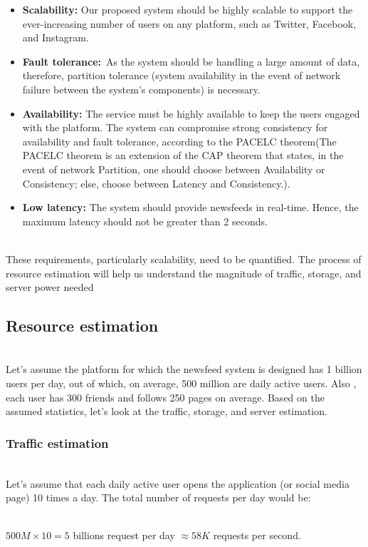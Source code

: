 \begin{itemize}
\item
\protect{}\label{ZL_UG12X7-Iq0C1Da_07h}
\textbf{Scalability:} Our proposed system should be highly scalable to support the ever-increasing number of users on any platform, such as Twitter, Facebook, and Instagram.
\item
\protect{}\label{K_x1dcLFJbFuUO-qIqH7S}
\textbf{Fault tolerance:}~As the system should be handling a large amount of data, therefore, partition tolerance (system availability in the event of network failure between the system's components) is necessary.
\item
\protect{}\label{2FhitDW1PT4TfB-fREaQK}
\textbf{Availability:} The service must be highly available to keep the users engaged with the platform. The system can compromise strong consistency for availability and fault tolerance, according to the PACELC theorem(The PACELC theorem is an extension of the CAP theorem that states, in the event of network Partition, one should choose between Availability or Consistency; else, choose between Latency and Consistency.).
\item
\protect{}\label{vdXEytb1i772djA9ZSONl}
\textbf{Low latency:} The system should provide newsfeeds in real-time. Hence, the maximum latency should not be greater than 2 seconds.
\end{itemize}
\\
These requirements, particularly scalability, need to be quantified. The process of resource estimation will help us understand the magnitude of traffic, storage, and server power needed

\subsection{Resource estimation}\label{kNIPR8-UqTn-HqJEJ50Mw}
\\
Let's assume the platform for which the newsfeed system is designed has 1 billion users per day, out of which, on average, 500 million are daily active users. Also , each user has 300 friends and follows 250 pages on average. Based on the assumed statistics, let's look at the traffic, storage, and server estimation.

\subsubsection{Traffic estimation}\label{gDv52qvIEas9go1133JX_}
\\
Let's assume that each daily active user opens the application (or social media page) 10 times a day. The total number of requests per day would be:\\
\strut \\
\protect{}\label{katex_inline_BmCFsJG0HqQ5yHRk99dOL}{{{\(500 M \times 10 = 5\)}}} billions request per day \protect{}\label{katex_inline_wfjU8pzxH-GVLVSbHQWr1}{{{\(\approx 58K\)}}} requests per second.

